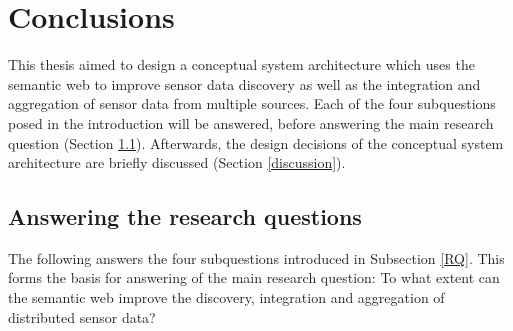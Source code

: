 

\chapter{Conclusions}
\label{chap:conclusion}

This thesis aimed to design a conceptual system architecture which uses the semantic web to improve sensor data discovery as well as the integration and aggregation of sensor data from multiple sources. Each of the four subquestions posed in the introduction will be answered, before answering the main research question (Section \ref{subquestions}). Afterwards, the design decisions of the conceptual system architecture are briefly discussed (Section \ref{discussion}). 

\section{Answering the research questions}
\label{subquestions}

The following answers the four subquestions introduced in Subsection \ref{RQ}. This forms the basis for answering of the main research question: To what extent can the semantic web improve the discovery, integration and aggregation of distributed sensor data?


